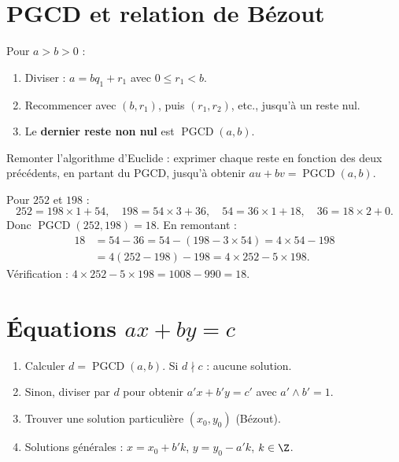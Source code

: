 
\section{PGCD et relation de Bézout}

\begin{methode}
Pour $a>b>0$ :
\begin{enumerate}[label=\textbf{Étape \arabic*.}]
  \item Diviser : $a=bq_1+r_1$ avec $0\le r_1<b$.
  \item Recommencer avec $(b,r_1)$, puis $(r_1,r_2)$, etc., jusqu'à un reste nul.
  \item Le \textbf{dernier reste non nul} est $\operatorname{PGCD}(a,b)$.
\end{enumerate}
\end{methode}

\begin{methode}
Remonter l'algorithme d'Euclide : exprimer chaque reste en fonction des deux précédents, en partant du PGCD, jusqu'à obtenir $au+bv=\operatorname{PGCD}(a,b)$.
\end{methode}

\begin{exemple}
Pour $252$ et $198$ :
\[
  252=198\times1+54,\quad 198=54\times3+36,\quad 54=36\times1+18,\quad 36=18\times2+0.
\]
Donc $\operatorname{PGCD}(252,198)=18$. En remontant :
\begin{align*}
18&=54-36=54-(198-3\times54)=4\times54-198\\
&=4(252-198)-198=4\times252-5\times198 .
\end{align*}
Vérification : $4\times252-5\times198=1008-990=18$.
\end{exemple}

\section{Équations $ax+by=c$}

\begin{methode}
\begin{enumerate}[label=\textbf{Étape \arabic*.}]
  \item Calculer $d=\operatorname{PGCD}(a,b)$. Si $d\nmid c$ : aucune solution.
  \item Sinon, diviser par $d$ pour obtenir $a'x+b'y=c'$ avec $a'\wedge b'=1$.
  \item Trouver une solution particulière $(x_0,y_0)$ (Bézout).
  \item Solutions générales : $x=x_0+b'k$, $y=y_0-a'k$, $k\in\Z$.
\end{enumerate}
\end{methode}

